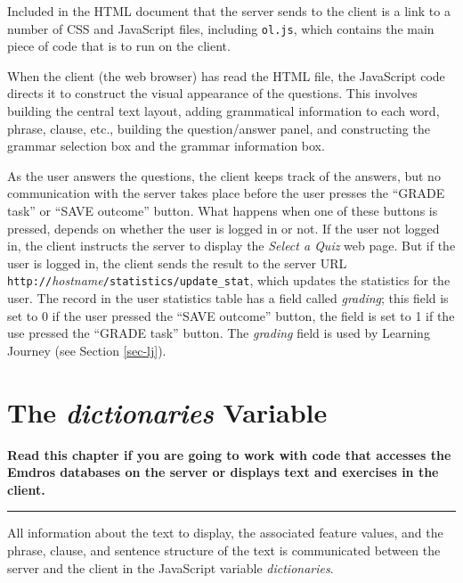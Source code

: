 \documentclass[11pt,oneside,a4paper]{memoir}
\begin{document}
Included in the HTML document that the server sends to the client is a link to a number of CSS and
JavaScript files, including \texttt{ol.js}, which contains the main piece of code that is to run on
the client.

When the client (the web browser) has read the HTML file, the JavaScript code directs it to
construct the visual appearance of the questions. This involves building the central text layout,
adding grammatical information to each word, phrase, clause, etc., building the question/answer
panel, and constructing the grammar selection box and the grammar
information box.

As the user answers the questions, the client keeps track of the answers, but no communication with
the server takes place before the user presses the ``GRADE task'' or ``SAVE outcome'' button. What
happens when one of these buttons is pressed, depends on whether the user is logged in or not. If
the user not logged in, the client instructs the server to display the \emph{Select a Quiz} web
page. But if the user is logged in, the client sends the result to the server URL
\texttt{http://}\textit{hostname}\texttt{/statistics/update\_stat}, which updates the
statistics for the user. The record in the user statistics table has a field
called \emph{grading}; this field is set to 0 if the user pressed the ``SAVE outcome'' button, the
field is set to 1 if the use pressed the ``GRADE task'' button. The \emph{grading} field is used by
Learning Journey (see Section \ref{sec-lj}).



\chapter{The \emph{dictionaries} Variable}\label{chap-dictionary}%

\textbf{Read this chapter if you are going to work with code that accesses the Emdros databases on
  the server or displays text and exercises in the client.}
\plainbreak{3}

All information about the text to display, the associated feature values, and the phrase, clause,
and sentence structure of the text is communicated between the server and the client in the
JavaScript variable \emph{dictionaries}.
\end{document}
